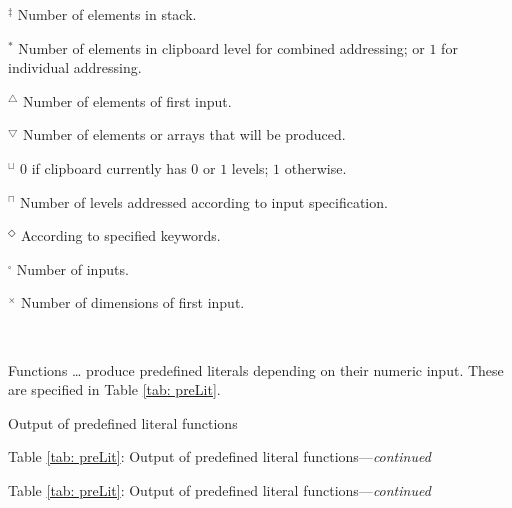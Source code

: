 \documentclass[12pt]{article}
\newcommand{\matl}[1]{{\ttfamily\color{fgmatl}{\hl{#1}}}} %
\begin{document}
\begin{appendices}
\begin{small}
$^\ddagger$ Number of elements in stack.

$^\ast$ Number of elements in clipboard level for combined addressing; or $1$ for individual addressing.

$^\triangle$ Number of elements of first input.

$^\bigtriangledown$ Number of elements or arrays that will be produced.

$^\sqcup$ $0$ if clipboard currently has $0$ or $1$ levels; $1$ otherwise.

$^\sqcap$ Number of levels addressed according to input specification.

$^\Diamond$ According to specified keywords.

$^\square$ Number of inputs.

$^\times$ Number of dimensions of first input.

\ %
\end{small}


Functions \matl{X0}\ldots\matl{Z9} produce predefined literals depending on their numeric input. These are specified in Table \ref{tab: preLit}.

\begin{table}
\centering
\caption{Output of predefined literal functions}
\label{tab: preLit}
\begin{small}





\end{small}
\end{table}

\begin{table}
\centering
\caption*{Table \ref{tab: preLit}: Output of predefined literal functions---\emph{continued}}
\begin{small}




\end{small}
\end{table}

\begin{table}
\centering
\caption*{Table \ref{tab: preLit}: Output of predefined literal functions---\emph{continued}}
\begin{small}

%
\end{small}
\end{table}


\end{appendices}
\end{document}
